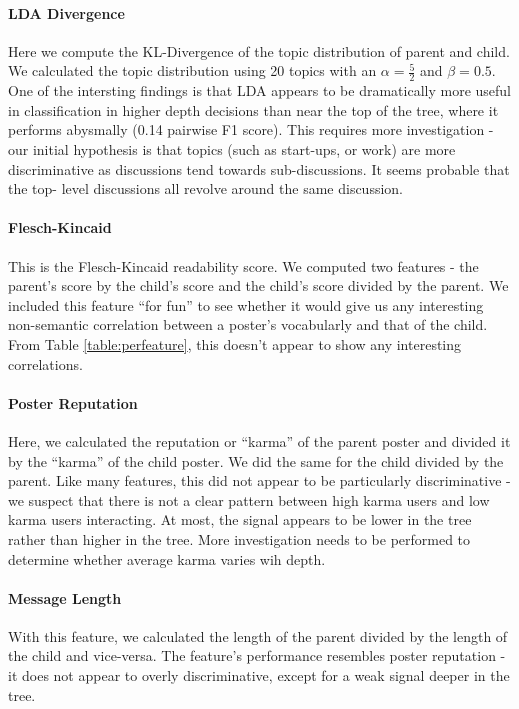 \documentclass{article}
\begin{document}
\paragraph{LDA Divergence} Here we compute the KL-Divergence of the topic distribution
of parent and child. We calculated the topic distribution using 20 topics with
an $\alpha=\frac{5}{2}$ and $\beta = 0.5$. One of the intersting findings is
that LDA appears to be dramatically more useful in classification in higher
depth decisions than near the top of the tree, where it performs abysmally
(0.14 pairwise F1 score). This requires more investigation - our initial
hypothesis is that topics (such as start-ups, or work) are more discriminative
as discussions tend towards sub-discussions. It seems probable that the top-
level discussions all revolve around the same discussion.

\paragraph{Flesch-Kincaid} This is the Flesch-Kincaid readability score. We computed
two features - the parent's score by the child's score and the child's score
divided by the parent. We included this feature ``for fun'' to see whether it
would give us any interesting non-semantic correlation between a poster's
vocabularly and that of the child. From Table \ref{table:perfeature}, this
doesn't appear to show any interesting correlations.

\paragraph{Poster Reputation} Here, we calculated the reputation or ``karma'' of the
parent poster and divided it by the ``karma'' of the child poster. We did the
same for the child divided by the parent. Like many features, this did not
appear to be particularly discriminative - we suspect that there is not a
clear pattern between high karma users and low karma users interacting. At
most, the signal appears to be lower in the tree rather than higher in the
tree. More investigation needs to be performed to determine whether average
karma varies wih depth.

\paragraph{Message Length} With this feature, we calculated the length of the
parent divided by the length of the child and vice-versa. The feature's
performance resembles poster reputation - it does not appear to overly
discriminative, except for a weak signal deeper in the tree.
\end{document}
